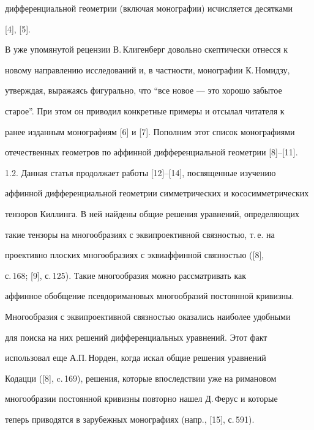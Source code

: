 дифференциальной геометрии (включая монографии) исчисляется десятками 


[4], [5].


 


В уже упомянутой рецензии В.\,Клигенберг довольно скептически отнесся к 


новому направлению исследований и, в частности, монографии К.\,Номидзу, 


утверждая, выражаясь фигурально, что ``все новое --- это хорошо забытое 


старое''. При этом он приводил конкретные примеры и отсылал читателя к 


ранее изданным монографиям [6] и [7]. Пополним этот список монографиями 


отечественных геометров по аффинной дифференциальной геометрии [8]--[11]. 


\medskip 


 


 


1.2. Данная статья продолжает работы [12]--[14], посвященные изучению 


аффинной дифференциальной геометрии симметрических и кососимметрических 


тензоров Киллинга. В ней найдены общие решения уравнений, определяющих 


такие тензоры на многообразиях с эквипроективной связностью, т.\,е. на 


проективно плоских многообразиях с эквиаффинной связностью ([8], 


с.\,168; [9], с.\,125). Такие многообразия можно рассматривать как 


аффинное обобщение псевдоримановых многообразий постоянной кривизны. 


Многообразия с эквипроективной связностью оказались наиболее удобными 


для поиска на них решений дифференциальных уравнений. Этот факт 


использовал еще А.П.\,Норден, когда искал общие решения уравнений 


Кодацци ([8], c.\,169), решения, которые впоследствии уже на римановом 


многообразии постоянной кривизны повторно нашел Д.\,Ферус и которые 


теперь приводятся в зарубежных монографиях (напр., [15], с.\,591). 



